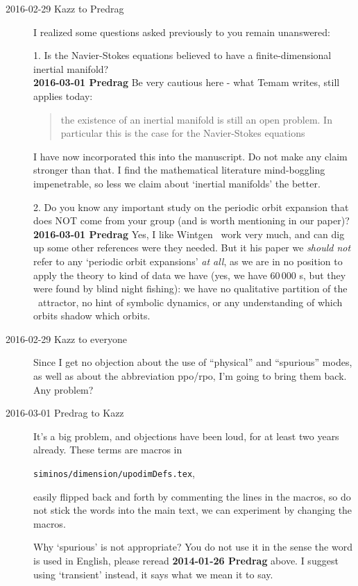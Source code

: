 \begin{description}
\item[2016-02-29 Kazz to Predrag]
I realized some questions asked previously to you remain unanswered:

1. Is the Navier-Stokes equations believed to have a finite-dimensional
inertial manifold?
\\ {\bf 2016-03-01 Predrag}
Be very cautious here - what
Temam writes, still applies today:

\begin{quote}
the existence of an inertial manifold is still an open problem. In
particular this is the case for the Navier-Stokes equations
\end{quote}

I have now incorporated this into the manuscript. Do not make any claim
stronger than that. I find the 
{mathematical literature} mind-boggling impenetrable, so less
we claim about `inertial manifolds' the better.

2. Do you know any important study on the periodic orbit expansion that
does NOT come from your group (and is worth mentioning in our paper)?
\\
{\bf 2016-03-01 Predrag} Yes, I like Wintgen \etal\ work very
much, and can dig up some other references were they needed. But it his
paper we \emph{should not} refer to any `periodic orbit expansions'
\emph{at all}, as we are in no position to apply the theory to kind
of data we have (yes, we have 60\,000 \rpo s, but they were found by
blind night fishing): we have no qualitative partition of the \KS\
attractor, no hint of symbolic dynamics, or any understanding of which
orbits shadow which orbits.

\item[2016-02-29 Kazz to everyone]
Since I get no objection about the use of ``physical'' and ``spurious''
modes, as well as about the abbreviation ppo/rpo, I'm going to bring them
back. Any problem?

\item[2016-03-01 Predrag to Kazz]
It's a big problem, and objections have been loud, for at least two years
already. These terms are macros in

\texttt{siminos/dimension/upodimDefs.tex},

easily flipped back and forth by commenting the lines in the macros, so
do not stick the words into the main text, we can experiment by changing
the macros.

Why `spurious' is not appropriate? You do not use it in the sense the
word is used in English, please reread {\bf 2014-01-26 Predrag} above. I
suggest using `transient' instead, it says what we mean it to say.


\end{description}
